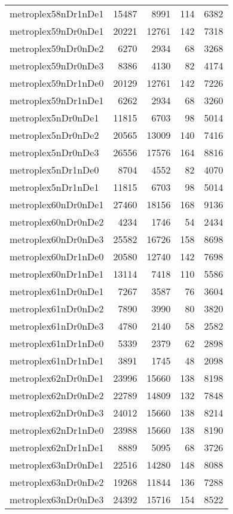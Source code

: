 \begin{longtable}{lrrrr}
metroplex58nDr1nDe1 & 15487 & 8991 & 114 & 6382 \\
metroplex59nDr0nDe1 & 20221 & 12761 & 142 & 7318 \\
metroplex59nDr0nDe2 & 6270 & 2934 & 68 & 3268 \\
metroplex59nDr0nDe3 & 8386 & 4130 & 82 & 4174 \\
metroplex59nDr1nDe0 & 20129 & 12761 & 142 & 7226 \\
metroplex59nDr1nDe1 & 6262 & 2934 & 68 & 3260 \\
metroplex5nDr0nDe1 & 11815 & 6703 & 98 & 5014 \\
metroplex5nDr0nDe2 & 20565 & 13009 & 140 & 7416 \\
metroplex5nDr0nDe3 & 26556 & 17576 & 164 & 8816 \\
metroplex5nDr1nDe0 & 8704 & 4552 & 82 & 4070 \\
metroplex5nDr1nDe1 & 11815 & 6703 & 98 & 5014 \\
metroplex60nDr0nDe1 & 27460 & 18156 & 168 & 9136 \\
metroplex60nDr0nDe2 & 4234 & 1746 & 54 & 2434 \\
metroplex60nDr0nDe3 & 25582 & 16726 & 158 & 8698 \\
metroplex60nDr1nDe0 & 20580 & 12740 & 142 & 7698 \\
metroplex60nDr1nDe1 & 13114 & 7418 & 110 & 5586 \\
metroplex61nDr0nDe1 & 7267 & 3587 & 76 & 3604 \\
metroplex61nDr0nDe2 & 7890 & 3990 & 80 & 3820 \\
metroplex61nDr0nDe3 & 4780 & 2140 & 58 & 2582 \\
metroplex61nDr1nDe0 & 5339 & 2379 & 62 & 2898 \\
metroplex61nDr1nDe1 & 3891 & 1745 & 48 & 2098 \\
metroplex62nDr0nDe1 & 23996 & 15660 & 138 & 8198 \\
metroplex62nDr0nDe2 & 22789 & 14809 & 132 & 7848 \\
metroplex62nDr0nDe3 & 24012 & 15660 & 138 & 8214 \\
metroplex62nDr1nDe0 & 23988 & 15660 & 138 & 8190 \\
metroplex62nDr1nDe1 & 8889 & 5095 & 68 & 3726 \\
metroplex63nDr0nDe1 & 22516 & 14280 & 148 & 8088 \\
metroplex63nDr0nDe2 & 19268 & 11844 & 136 & 7288 \\
metroplex63nDr0nDe3 & 24392 & 15716 & 154 & 8522 \\

\end{longtable}
